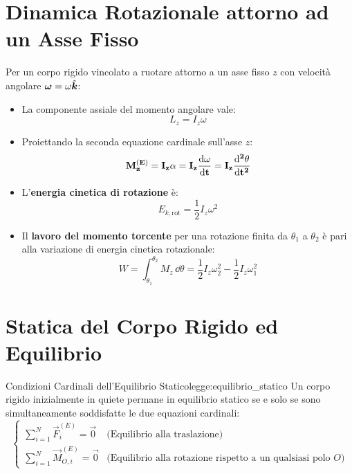\section{Dinamica Rotazionale attorno ad un Asse Fisso}
\label{sec:dinamica_rotazionale}

Per un corpo rigido vincolato a ruotare attorno a un asse fisso $z$ con velocità angolare $\bm{\omega} = \omega\hat{\bm{k}}$:
\begin{itemize}
    \item La componente assiale del momento angolare vale:
    \begin{equation}
        L_z = I_z \omega
    \end{equation}
    \item Proiettando la seconda equazione cardinale sull'asse $z$:
    \begin{equation}
        \mathbf{M_z^{(E)} = I_z \alpha = I_z \frac{\mathrm{d} \omega}{\mathrm{d} t} = I_z \frac{\mathrm{d}^2 \theta}{\mathrm{d} t^2}}
        \label{eq:seconda_cardinale_rotazione}
    \end{equation}
    \item L'\textbf{energia cinetica di rotazione} è:
    \begin{equation}
        E_{k,\text{rot}} = \frac{1}{2}I_z \omega^2
    \end{equation}
    \item Il \textbf{lavoro del momento torcente} per una rotazione finita da $\theta_1$ a $\theta_2$ è pari alla variazione di energia cinetica rotazionale:
    \begin{equation}
        W = \int_{\theta_1}^{\theta_2} M_z\,\dd\theta = \frac{1}{2}I_z \omega_2^2 - \frac{1}{2}I_z \omega_1^2
    \end{equation}
\end{itemize}

\section{Statica del Corpo Rigido ed Equilibrio}
\label{sec:statica_corpo_rigido}

\begin{legge}{Condizioni Cardinali dell'Equilibrio Statico}{legge:equilibrio_statico}
Un corpo rigido inizialmente in quiete permane in equilibrio statico se e solo se sono simultaneamente soddisfatte le due equazioni cardinali:
\begin{equation}
    \begin{cases}
        \sum_{i=1}^N \vec{F}_i^{(E)} = \vec{0} & \text{(Equilibrio alla traslazione)} \\[1ex]
        \sum_{i=1}^N \vec{M}_{O,i}^{(E)} = \vec{0} & \text{(Equilibrio alla rotazione rispetto a un qualsiasi polo } O\text{)}
    \end{cases}
    \label{eq:condizioni_statica}
\end{equation}
\end{legge}

